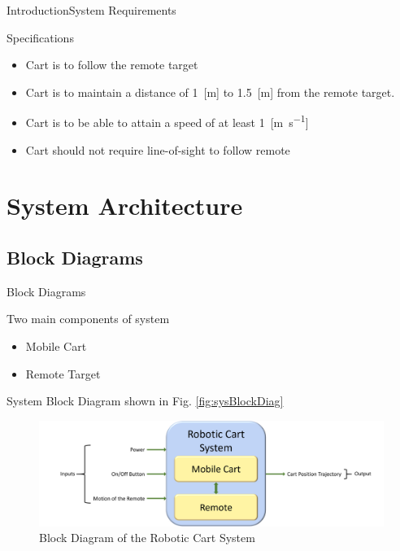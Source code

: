 \documentclass{beamer}
\begin{document}
\begin{frame}{Introduction}{System Requirements}
  \begin{block}{Specifications}
    \begin{itemize}
      \item Cart is to follow the remote target
      \item Cart is to maintain a distance of 1~[\si{\meter}] to 1.5~[\si{\meter}] from the remote target.
      \item Cart is to be able to attain a speed of at least 1~[\si{\meter\per\second}]
      \item Cart should not require line-of-sight to follow remote
     \end{itemize}
  \end{block}
\end{frame}



\section{System Architecture}

\subsection{Block Diagrams}
\begin{frame}{Block Diagrams}
  \begin{block}{}
    Two main components of system
    \begin{itemize}
      \item Mobile Cart
      \item Remote Target
    \end{itemize}
    System Block Diagram shown in Fig. \autoref{fig:sysBlockDiag}
  \end{block}
  \begin{figure}[b]
    \centering
    \includegraphics[width=\textwidth]{figs/img/systemBlockDiagram.png}
    \caption{Block Diagram of the Robotic Cart System}
    \label{fig:sysBlockDiag}
  \end{figure}
\end{frame}
\end{document}
